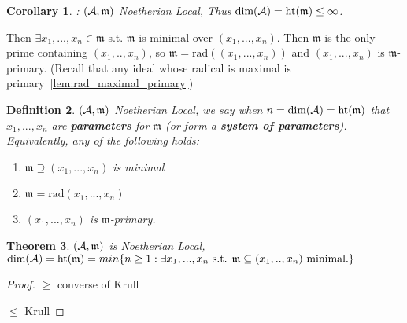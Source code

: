\documentclass[11pt]{article}
\newtheorem{thm}{Theorem}[section]
\newtheorem{cor}[thm]{Corollary}
\newtheorem{dfn}[thm]{Definition}
\newcommand{\scm}{{\mathfrak m}}
\newcommand{\cala}{{\cal A}}
\begin{document}
\begin{cor}: $(\cala,\scm)$ Noetherian Local, Thus $\text{dim}(\cala)=\text{ht}(\scm)\leq \infty$.
\end{cor}
Then $\exists x_1,...,x_n\in\scm$ s.t. $\scm$ is minimal over $(x_1,...,x_n)$. Then $\scm$ is the only prime containing $(x_1,..,x_n)$, so $\scm=\text{rad}((x_1,...,x_n))$ and $(x_1,...,x_n)$ is $\scm$-primary. (Recall that any ideal whose radical is maximal is primary~\ref{lem:rad_maximal_primary})

\begin{dfn}$(\cala,\scm)$ Noetherian Local,
we say when $n=\text{dim}(\cala)=\text{ht}(\scm)$ that $x_1,...,x_n$ are \textbf{parameters} for $\scm$ (or form a \textbf{system of parameters}). Equivalently, any of the following holds:
\begin{enumerate}[label=(\roman*)]
\item $\scm\supseteq (x_1,...,x_n)$ is minimal
\item $\scm=\text{rad}(x_1,...,x_n)$
\item $(x_1,...,x_n)$ is $\scm$-primary.
\end{enumerate}
\end{dfn}

\begin{thm}\label{thm:dim_in_terms_of_parameters}
$(\cala,\scm)$ is Noetherian Local, $\text{dim}(\cala)=\text{ht}(\scm)=min\{n\geq 1:\exists x_1,...,x_n\text{ s.t. }\scm\subseteq (x_1,..,x_n)\text{ minimal.}\}$
\end{thm}
\begin{proof}
$\geq$ converse of Krull

$\leq $ Krull
\end{proof}
\end{document}
